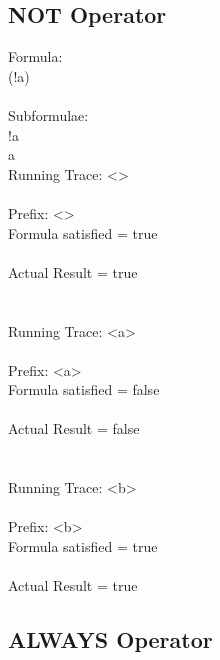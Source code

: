 \subsection{NOT Operator}

Formula:\\
(!a)\\
\\
Subformulae:\\
!a\\
a\\

\noindent Running Trace: \textless \textgreater\\
\\
  Prefix: \textless \textgreater\\
  Formula satisfied = true\\
\\
  Actual Result = true\\
\\
\\
Running Trace: \textless a\textgreater\\
\\
  Prefix: \textless a\textgreater\\
  Formula satisfied = false\\
\\
  Actual Result = false\\
\\
\\
Running Trace: \textless b\textgreater\\
\\
  Prefix: \textless b\textgreater\\
  Formula satisfied = true\\
\\
  Actual Result = true\\

\subsection{ALWAYS Operator}

